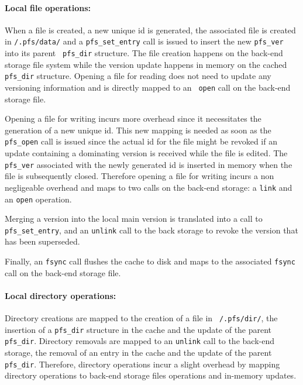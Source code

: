 \paragraph{Local file operations:}
When a file is created, a new unique id is generated, the associated
file is created in {\tt /.pfs/data/} and a {\tt pfs\_set\_entry} call
is issued to insert the new {\tt pfs\_ver} into its parent {\tt
  pfs\_dir} structure. The file creation happens on the back-end storage
file system while the version update happens in memory on the cached
{\tt pfs\_dir} structure. Opening a file for reading does not need to
update any versioning information and is directly mapped to an {\tt
  open} call on the back-end storage file. 

Opening a file for writing incurs more overhead since it necessitates the
generation of a new unique id. This new mapping is needed as soon as
the {\tt pfs\_open} call is issued since the actual id for the file
might be revoked if an update containing a dominating version is
received while the file is edited. The {\tt pfs\_ver} associated with
the newly generated id is inserted in memory when the file is
subsequently closed. Therefore opening a file for writing incurs a non
negligeable overhead and maps to two calls on the back-end storage: a
{\tt link} and an {\tt open} operation.

Merging a version into the local main version is translated into a
call to {\tt pfs\_set\_entry}, and an {\tt unlink} call to the back
storage to revoke the version that has been superseded.

Finally, an {\tt fsync} call flushes the cache to disk and maps to the
associated {\tt fsync} call on the back-end storage file.

\paragraph{Local directory operations:}
Directory creations are mapped to the creation of a file in {\tt
  /.pfs/dir/}, the insertion of a {\tt pfs\_dir} structure in the
cache and the update of the parent {\tt pfs\_dir}. Directory removals
are mapped to an {\tt unlink} call to the back-end storage, the removal of
an entry in the cache and the update of the parent {\tt
  pfs\_dir}. Therefore, directory operations incur a slight overhead
by mapping directory operations to back-end storage files operations and
in-memory updates.


\paragraph{}

